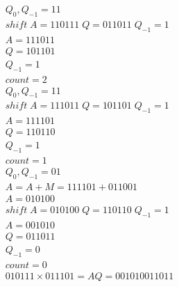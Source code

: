 \documentclass[12pt, a4paper]{article}
\begin{document}
				\begin{align*}
					Q_0,Q_{-1}=11\\
					shift\; A=110111\; Q=011011\; Q_{-1}=1\\
					A=111011\\
					Q=101101\\
					Q_{-1}=1\\
					count=2\\[4mm]
					Q_0,Q_{-1}=11\\
					shift\; A=111011\; Q=101101\; Q_{-1}=1\\
					A=111101\\
					Q=110110\\
					Q_{-1}=1\\
					count=1\\[4mm]
					Q_0,Q_{-1}=01\\
					A=A+M=111101+011001\\
					A=010100\\
					shift\; A=010100\; Q=110110\; Q_{-1}=1\\
					A=001010\\
					Q=011011\\
					Q_{-1}=0\\
					count=0\\[4mm]
					010111\times 011101 = AQ=001010011011
					\end{align*}
		
\end{document}
